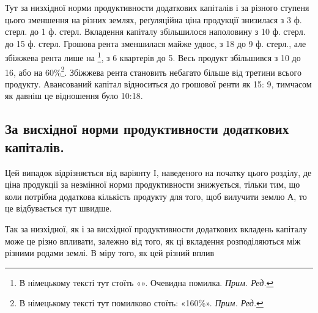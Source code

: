 Тут за низхідної норми продуктивности додаткових капіталів і за різного
ступеня цього зменшення на різних землях, реґуляційна ціна продукції знизилася
з 3 ф. стерл. до 1 ф. стерл. Вкладення капіталу збільшилося наполовину з 10 ф.
стерл. до 15 ф. стерл. Грошова рента зменшилася майже удвоє, з 18 до 9  ф.
стерл., але збіжжева рента лише на  \footnote*{
В німецькому тексті тут стоїть «». Очевидна помилка. \emph{Прим. Ред.}
}, з 6 квартерів до 5. Весь продукт
збільшився з 10 до 16, або на 60\%\footnote*{
В німецькому тексті тут помилково стоїть: «160\%». \emph{Прим. Ред.}
}. Збіжжева рента становить небагато більше
від третини всього продукту. Авансований капітал відноситься до грошової ренти
як 15: 9, тимчасом як давніш це відношення було 10:18.

\subsection{За висхідної норми продуктивности додаткових капіталів.}

Цей випадок відрізняється від варіянту І, наведеного на початку цього
розділу, де ціна продукції за незмінної норми продуктивности знижується, тільки
тим, що коли потрібна додаткова кількість продукту для того, щоб вилучити
землю А, то це відбувається тут швидше.

Так за низхідної, як і за висхідної продуктивности додаткових вкладень
капіталу може це різно впливати, залежно від того, як ці вкладення розподіляються
між різними родами землі. В міру того, як цей різний вплив
\parbreak{}  %

